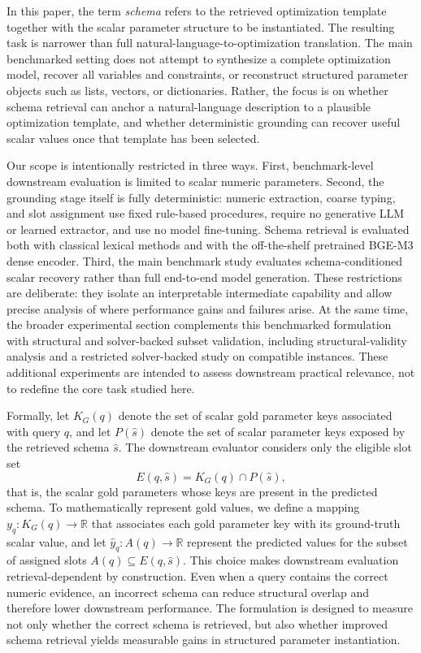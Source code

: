 \documentclass[pdflatex,sn-basic,Numbered]{sn-jnl}
\begin{document}
In this paper, the term \emph{schema} refers to the retrieved optimization template together with the scalar parameter structure to be instantiated. The resulting task is narrower than full natural-language-to-optimization translation. The main benchmarked setting does not attempt to synthesize a complete optimization model, recover all variables and constraints, or reconstruct structured parameter objects such as lists, vectors, or dictionaries. Rather, the focus is on whether schema retrieval can anchor a natural-language description to a plausible optimization template, and whether deterministic grounding can recover useful scalar values once that template has been selected.

Our scope is intentionally restricted in three ways. First, benchmark-level downstream evaluation is limited to scalar numeric parameters. Second, the grounding stage itself is fully deterministic: numeric extraction, coarse typing, and slot assignment use fixed rule-based procedures, require no generative LLM or learned extractor, and use no model fine-tuning. Schema retrieval is evaluated both with classical lexical methods and with the off-the-shelf pretrained BGE-M3 dense encoder. Third, the main benchmark study evaluates schema-conditioned scalar recovery rather than full end-to-end model generation. These restrictions are deliberate: they isolate an interpretable intermediate capability and allow precise analysis of where performance gains and failures arise. At the same time, the broader experimental section complements this benchmarked formulation with structural and solver-backed subset validation, including structural-validity analysis and a restricted solver-backed study on compatible instances. These additional experiments are intended to assess downstream practical relevance, not to redefine the core task studied here.

Formally, let $K_G(q)$ denote the set of scalar gold parameter keys associated with query $q$, and let $P(\hat{s})$ denote the set of scalar parameter keys exposed by the retrieved schema $\hat{s}$. The downstream evaluator considers only the eligible slot set
\begin{equation}
E(q,\hat{s}) = K_G(q) \cap P(\hat{s}),
\label{eq:eligible_slots}
\end{equation}
that is, the scalar gold parameters whose keys are present in the predicted schema. To mathematically represent gold values, we define a mapping $y_q : K_G(q) \to \mathbb{R}$ that associates each gold parameter key with its ground-truth scalar value, and let $\hat{y}_{q} : A(q) \to \mathbb{R}$ represent the predicted values for the subset of assigned slots $A(q) \subseteq E(q, \hat{s})$. This choice makes downstream evaluation retrieval-dependent by construction. Even when a query contains the correct numeric evidence, an incorrect schema can reduce structural overlap and therefore lower downstream performance. The formulation is designed to measure not only whether the correct schema is retrieved, but also whether improved schema retrieval yields measurable gains in structured parameter instantiation.
\end{document}

